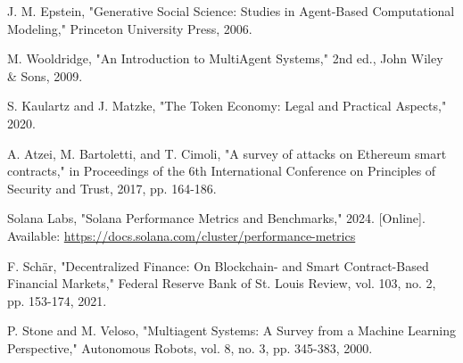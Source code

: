 \documentclass[12pt,a4paper]{article}
\begin{document}
\begin{thebibliography}{99}
J. M. Epstein, "Generative Social Science: Studies in Agent-Based Computational Modeling," Princeton University Press, 2006.

M. Wooldridge, "An Introduction to MultiAgent Systems," 2nd ed., John Wiley \& Sons, 2009.

S. Kaulartz and J. Matzke, "The Token Economy: Legal and Practical Aspects," 2020.

A. Atzei, M. Bartoletti, and T. Cimoli, "A survey of attacks on Ethereum smart contracts," in Proceedings of the 6th International Conference on Principles of Security and Trust, 2017, pp. 164-186.

Solana Labs, "Solana Performance Metrics and Benchmarks," 2024. [Online]. Available: \url{https://docs.solana.com/cluster/performance-metrics}

F. Schär, "Decentralized Finance: On Blockchain- and Smart Contract-Based Financial Markets," Federal Reserve Bank of St. Louis Review, vol. 103, no. 2, pp. 153-174, 2021.

P. Stone and M. Veloso, "Multiagent Systems: A Survey from a Machine Learning Perspective," Autonomous Robots, vol. 8, no. 3, pp. 345-383, 2000.

\end{thebibliography}
\end{document}
